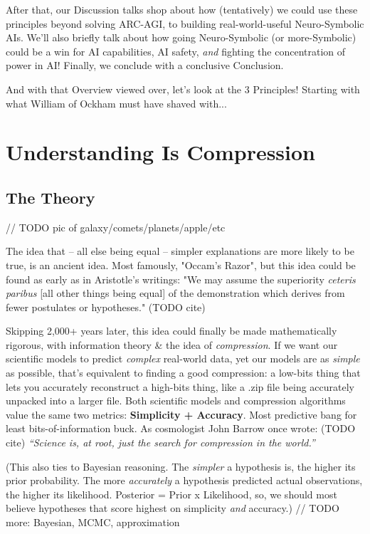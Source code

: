 \documentclass{article}
\begin{document}
After that, our Discussion talks shop about how (tentatively) we could use these principles beyond solving ARC-AGI, to building real-world-useful Neuro-Symbolic AIs. We'll also briefly talk about how going Neuro-Symbolic (or more-Symbolic) could be a win for AI capabilities, AI safety, \textit{and} fighting the concentration of power in AI! Finally, we conclude with a conclusive Conclusion.

And with that Overview viewed over, let's look at the 3 Principles! Starting with what William of Ockham must have shaved with...

\section{Understanding Is Compression}

\subsection{The Theory}

// TODO pic of galaxy/comets/planets/apple/etc 

The idea that -- all else being equal -- simpler explanations are more likely to be true, is an ancient idea. Most famously, "Occam's Razor", but this idea could be found as early as in Aristotle's writings: "We may assume the superiority \textit{ceteris paribus} [all other things being equal] of the demonstration which derives from fewer postulates or hypotheses." (TODO cite)

Skipping 2,000+ years later, this idea could finally be made mathematically rigorous, with information theory \& the idea of \textit{compression}. If we want our scientific models to predict \textit{complex} real-world data, yet our models are as \textit{simple} as possible, that's equivalent to finding a good compression: a low-bits thing that lets you accurately reconstruct a high-bits thing, like a .zip file being accurately unpacked into a larger file. Both scientific models and compression algorithms value the same two metrics: \textbf{Simplicity + Accuracy}. Most predictive bang for least bits-of-information buck. As cosmologist John Barrow once wrote: (TODO cite) \textit{“Science is, at root, just the search for compression in the world.”}

(This also ties to Bayesian reasoning. The \textit{simpler} a hypothesis is, the higher its prior probability. The more \textit{accurately} a hypothesis predicted actual observations, the higher its likelihood. Posterior = Prior x Likelihood, so, we should most believe hypotheses that score highest on simplicity \textit{and} accuracy.) // TODO more: Bayesian, MCMC, approximation
\end{document}
